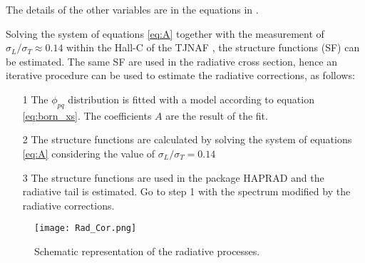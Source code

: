 The details of the other variables are in the equations in \cite{Akushevich1999}.

Solving the system of equations \eqref{eq:A} together with the measurement of $\sigma_L/\sigma_T \approx 0.14$ within the Hall-C of the TJNAF  \cite{rlt_hallC}, the structure functions (SF) can be estimated. The same SF are used in the radiative cross section, hence an iterative procedure can be used to estimate the radiative corrections, as follows: 

\begin{itemize}
\item[1] The $\phi_{pq}$ distribution is fitted with a model according to equation \eqref{eq:born_xs}. The coefficients $A$ are the result of the fit.
\item[2] The structure functions are calculated by solving the system of equations \eqref{eq:A} considering the value of $\sigma_L / \sigma_T = 0.14$
\item[3] The structure functions are used in the package HAPRAD \cite{Akushevich1999} and the radiative tail is estimated. Go to step 1 with the spectrum modified by the radiative corrections.  
\end{itemize}
%
\begin{figure}[!ht]
\centering
\texttt{[image: Rad\_Cor.png]}
\caption{Schematic representation of the radiative processes.}
\label{fig:RC_FD}
\end{figure}
